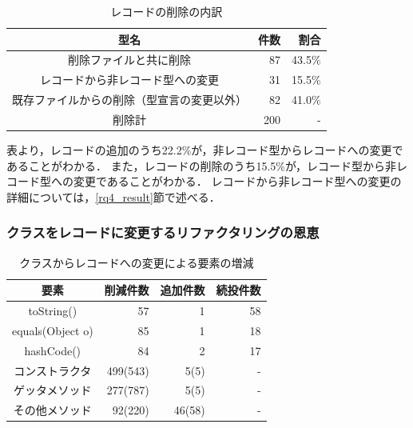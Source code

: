 \begin{table}[t]
    \caption{レコードの削除の内訳}
    \label{record_deletion}
    \centering
    \begin{tabular}{c||r|r}
        \hline
        型名 & 件数 & 割合\\
        \hline\hline
        削除ファイルと共に削除 & 87 & 43.5\%\\
        レコードから非レコード型への変更 & 31 & 15.5\%\\
        既存ファイルからの削除（型宣言の変更以外） & 82 & 41.0\%\\
        \hline
        削除計 & 200 &-\\
        \hline
    \end{tabular}
\end{table}

表より，レコードの追加のうち22.2\%が，非レコード型からレコードへの変更であることがわかる．
また，レコードの削除のうち15.5\%が，レコード型から非レコード型への変更であることがわかる．
レコードから非レコード型への変更の詳細については，\ref{rq4_result}節で述べる．

\subsubsection{クラスをレコードに変更するリファクタリングの恩恵}

\begin{table}[t]
  \caption{クラスからレコードへの変更による要素の増減}
  \label{refactoring_content}
  \centering
  \begin{tabular}{c||r|r|r}
      \hline
      要素 & 削減件数 & 追加件数 & 続投件数\\
      \hline\hline
      toString() & 57 & 1 & 58\\
      equals(Object o) & 85 & 1 & 18\\
      hashCode() & 84 & 2 & 17\\
      コンストラクタ & 499(543) & 5(5) & -\\
      ゲッタメソッド & 277(787) & 5(5) & -\\
      その他メソッド & 92(220) & 46(58) & -\\
      \hline
  \end{tabular}
\end{table}

